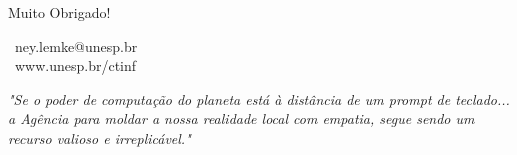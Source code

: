 \documentclass[aspectratio=169,12pt]{beamer}
\begin{document}
\begin{frame}
    \begin{center}
        {\Huge \textcolor{accent}{Muito Obrigado!}}
        
        \vspace{1cm}
        \faEnvelope\, ney.lemke@unesp.br \\
        \faGlobe\, www.unesp.br/ctinf 
        
        \vspace{1cm}
        \textit{"Se o poder de computação do planeta está à distância de um prompt de teclado... a Agência para moldar a nossa realidade local com empatia, segue sendo um recurso valioso e irreplicável."}
    \end{center}
\end{frame}
\end{document}
